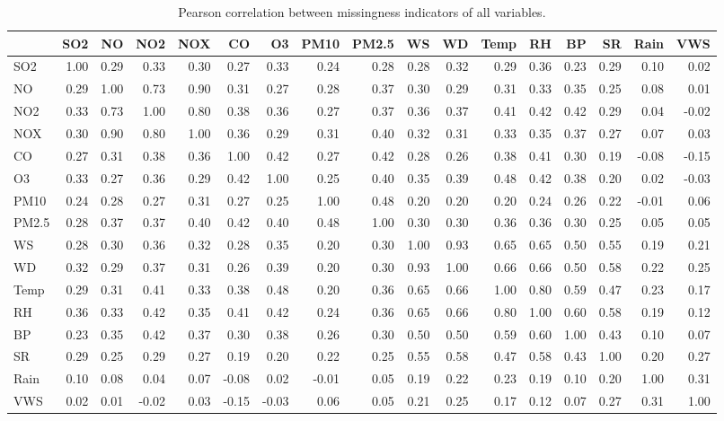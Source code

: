 \begin{table}
\caption{Pearson correlation between missingness indicators of all variables.}
\label{tab:co_missingness}
\begin{tabular}{lrrrrrrrrrrrrrrrr}
\toprule
 & SO2 & NO & NO2 & NOX & CO & O3 & PM10 & PM2.5 & WS & WD & Temp & RH & BP & SR & Rain & VWS \\
\midrule
SO2 & 1.00 & 0.29 & 0.33 & 0.30 & 0.27 & 0.33 & 0.24 & 0.28 & 0.28 & 0.32 & 0.29 & 0.36 & 0.23 & 0.29 & 0.10 & 0.02 \\
NO & 0.29 & 1.00 & 0.73 & 0.90 & 0.31 & 0.27 & 0.28 & 0.37 & 0.30 & 0.29 & 0.31 & 0.33 & 0.35 & 0.25 & 0.08 & 0.01 \\
NO2 & 0.33 & 0.73 & 1.00 & 0.80 & 0.38 & 0.36 & 0.27 & 0.37 & 0.36 & 0.37 & 0.41 & 0.42 & 0.42 & 0.29 & 0.04 & -0.02 \\
NOX & 0.30 & 0.90 & 0.80 & 1.00 & 0.36 & 0.29 & 0.31 & 0.40 & 0.32 & 0.31 & 0.33 & 0.35 & 0.37 & 0.27 & 0.07 & 0.03 \\
CO & 0.27 & 0.31 & 0.38 & 0.36 & 1.00 & 0.42 & 0.27 & 0.42 & 0.28 & 0.26 & 0.38 & 0.41 & 0.30 & 0.19 & -0.08 & -0.15 \\
O3 & 0.33 & 0.27 & 0.36 & 0.29 & 0.42 & 1.00 & 0.25 & 0.40 & 0.35 & 0.39 & 0.48 & 0.42 & 0.38 & 0.20 & 0.02 & -0.03 \\
PM10 & 0.24 & 0.28 & 0.27 & 0.31 & 0.27 & 0.25 & 1.00 & 0.48 & 0.20 & 0.20 & 0.20 & 0.24 & 0.26 & 0.22 & -0.01 & 0.06 \\
PM2.5 & 0.28 & 0.37 & 0.37 & 0.40 & 0.42 & 0.40 & 0.48 & 1.00 & 0.30 & 0.30 & 0.36 & 0.36 & 0.30 & 0.25 & 0.05 & 0.05 \\
WS & 0.28 & 0.30 & 0.36 & 0.32 & 0.28 & 0.35 & 0.20 & 0.30 & 1.00 & 0.93 & 0.65 & 0.65 & 0.50 & 0.55 & 0.19 & 0.21 \\
WD & 0.32 & 0.29 & 0.37 & 0.31 & 0.26 & 0.39 & 0.20 & 0.30 & 0.93 & 1.00 & 0.66 & 0.66 & 0.50 & 0.58 & 0.22 & 0.25 \\
Temp & 0.29 & 0.31 & 0.41 & 0.33 & 0.38 & 0.48 & 0.20 & 0.36 & 0.65 & 0.66 & 1.00 & 0.80 & 0.59 & 0.47 & 0.23 & 0.17 \\
RH & 0.36 & 0.33 & 0.42 & 0.35 & 0.41 & 0.42 & 0.24 & 0.36 & 0.65 & 0.66 & 0.80 & 1.00 & 0.60 & 0.58 & 0.19 & 0.12 \\
BP & 0.23 & 0.35 & 0.42 & 0.37 & 0.30 & 0.38 & 0.26 & 0.30 & 0.50 & 0.50 & 0.59 & 0.60 & 1.00 & 0.43 & 0.10 & 0.07 \\
SR & 0.29 & 0.25 & 0.29 & 0.27 & 0.19 & 0.20 & 0.22 & 0.25 & 0.55 & 0.58 & 0.47 & 0.58 & 0.43 & 1.00 & 0.20 & 0.27 \\
Rain & 0.10 & 0.08 & 0.04 & 0.07 & -0.08 & 0.02 & -0.01 & 0.05 & 0.19 & 0.22 & 0.23 & 0.19 & 0.10 & 0.20 & 1.00 & 0.31 \\
VWS & 0.02 & 0.01 & -0.02 & 0.03 & -0.15 & -0.03 & 0.06 & 0.05 & 0.21 & 0.25 & 0.17 & 0.12 & 0.07 & 0.27 & 0.31 & 1.00 \\
\bottomrule
\end{tabular}
\end{table}
